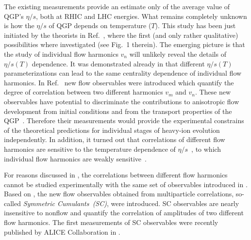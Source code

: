 The existing measurements provide an estimate only of the average value of QGP's $\eta/s$, both at RHIC and LHC energies. What remains completely unknown is how the $\eta/s$ of QGP depends on temperature ($T$). This study has been just initiated by the theorists in Ref.~\cite{Niemi:2015qia}, where the first (and only rather qualitative) possibilities where investigated (see Fig.~1 therein). The emerging picture is that the study of individual flow harmonics $v_n$ will unlikely reveal the details of $\eta/s(T)$ dependence.
It was demonstrated already in \cite{Niemi:2015qia} that different $\eta/s(T)$ parameterizations can lead to the same centrality dependence of individual flow harmonics. In Ref.~\cite{Niemi:2012aj} new flow observables were introduced which quantify the degree of correlation between two different harmonics $v_m$ and $v_n$. These new observables have potential to discriminate the contributions to anisotropic flow development from initial conditions and from the transport properties of the QGP~\cite{Niemi:2012aj}. Therefore their measurements would provide the experimental constrains of the theoretical predictions for individual stages of heavy-ion evolution independently. In addition, it turned out that correlations of different flow harmonics are sensitive to the temperature dependence of $\eta/s$~\cite{ALICE:2016kpq}, to which individual flow harmonics are weakly sensitive~\cite{Niemi:2015qia}. 
 
For reasons discussed in \cite{ALICE:2016kpq,Bilandzic:2013kga}, the correlations between different flow harmonics cannot be studied experimentally with the same set of observables introduced in \cite{Niemi:2012aj}. 
Based on \cite{Bilandzic:2013kga}, the new flow observables obtained from multiparticle correlations, so-called \textit{Symmetric Cumulants~(SC)}, were introduced. SC observables are nearly insensitive to nonflow and quantify the correlation of amplitudes of two different flow harmonics.
The first measurements of SC observables were recently published by ALICE Collaboration in \cite{ALICE:2016kpq}.

